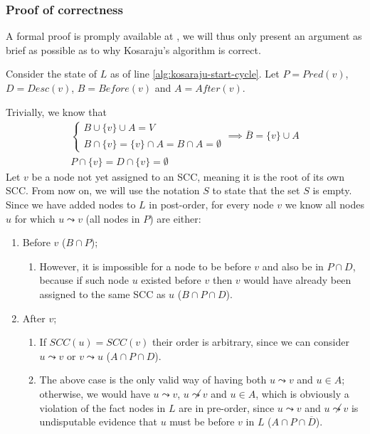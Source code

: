 \subsubsection{Proof of correctness}
A formal proof is promply available at \cite[p.~619]{intro-alg}, we will thus only present an argument as brief as possible as to why Kosaraju's algorithm is correct.\par
Consider the state of $L$ as of line \ref{alg:kosaraju-start-cycle}. Let $P = Pred(v)$, $D = Desc(v)$, $B = Before(v)$ and $A=After(v)$.\par
Trivially, we know that
\begin{gather} \label{eq:ABpart}
    \begin{cases}
        B \cup \{v\} \cup A = V \\
        B \cap \{v\} = \{v\} \cap A = B \cap A = \emptyset
    \end{cases} \implies \overline{B} = \{v\} \cup A \\
    \label{eq:vnotinPD}
    P \cap \{v\} = D\cap\{v\}=\emptyset
\end{gather}
Let $v$ be a node not yet assigned to an \acrshort*{SCC}, meaning it is the root of its own \acrshort*{SCC}. From now on, we will use the notation \sout{$S$} to state that the set $S$ is empty.
Since we have added nodes to $L$ in post-order, for every node $v$ we know all nodes $u$ for which $u \leadsto v$ (all nodes in $P$) are either:
\begin{enumerate}[topsep=0.5em]
    \item \label{itm:B} Before $v$ ($B \cap P$);
    \begin{enumerate}[topsep=0em]
        \item \label{itm:Bexcept} However, it is impossible for a node to be before $v$ and also be in $P \cap D$, because if such node $u$ existed before $v$ then $v$ would have already been assigned to the same \acrshort*{SCC} as $u$ (\sout{$B \cap P \cap D$}).
    \end{enumerate} 
    \item \label{itm:A} After $v$;
    \begin{enumerate}[topsep=0em]
        \item \label{itm:Agood} If $SCC(u)=SCC(v)$ their order is arbitrary, since we can consider $u \leadsto v$ or $v \leadsto u$ ($A \cap P \cap D$).
        \item \label{itm:Abad} The above case is the only valid way of having both $u \leadsto v$ and $u \in A$; otherwise, we would have $u \leadsto v$, $u \not \leadsto v$ and $u \in A$, which is obviously a violation of the fact nodes in $L$ are in pre-order, since $u \leadsto v$ and $u \not \leadsto v$ is undisputable evidence that $u$ must be before $v$ in $L$ (\sout{$A \cap P \cap \overline{D}$}).
    \end{enumerate}
\end{enumerate}
